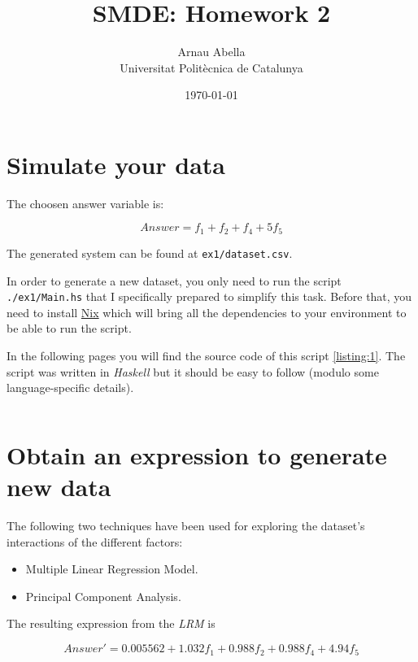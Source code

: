 \documentclass[12pt, a4paper]{article} %
\title{%
  SMDE: Homework 2
}
\author{%
  Arnau Abella \\
  \large{Universitat Polit\`ecnica de Catalunya}
}
\date{\today}
\theoremstyle{definition}
\newcommand{\code}[1]{\texttt{#1}} %
\begin{document}
\maketitle


\section{Simulate your data}

The choosen answer variable is:

\begin{equation}
  Answer = f_1 + f_2 + f_4 + 5 f_5
\end{equation}

The generated system can be found at \code{ex1/dataset.csv}.

In order to generate a new dataset, you only need to run the script \code{./ex1/Main.hs} that I specifically prepared to simplify this task. Before that, you need to install \href{https://nixos.org/download.html}{Nix} which will bring all the dependencies to your environment to be able to run the script.

In the following pages you will find the source code of this script \ref{listing:1}. The script was written in \textit{Haskell} but it should be easy to follow (modulo some language-specific details).

\newpage

\inputminted{haskell}{../ex1/Main.hs}\label{listing:1}


\section{Obtain an expression to generate new data}

The following two techniques have been used for exploring the dataset's interactions of the different factors:

\begin{itemize}
  \item Multiple Linear Regression Model.
  \item Principal Component Analysis.
\end{itemize}

The resulting expression from the \textit{LRM} is

\begin{equation}
  Answer' = 0.005562 + 1.032f_1 + 0.988f_2 + 0.988f_4 + 4.94f_5
\end{equation}
\end{document}
